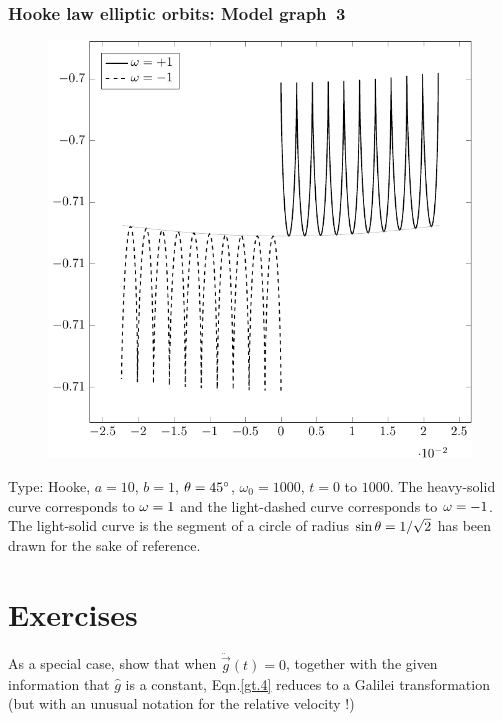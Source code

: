\subsubsection*{Hooke law elliptic orbits: Model graph~3}
\begin{figure}[H]
\centering
\includegraphics[scale=.4]{src/images/lbk-graphics/larm-h-10-1-45-1-1000.pdf}
\caption*{}
\vspace{-.3cm}
\end{figure}

Type: Hooke, $a = 10 $, $b = 1$, ${\theta} = \ang{45}$, 
$\omega_0 = 1000$, $t =0$ to $1000$. The heavy-solid curve 
corresponds to ${\omega} = 1$ and the light-dashed curve 
corresponds to ${\omega} = -1$. The light-solid curve is the 
segment of a  circle of radius $\sin {\theta} = 1 / \sqrt{2}$ 
has been drawn for the sake of reference.

\newpage

\section*{Exercises}

\exise As a special case, show that when 
$\ddot{\vec{g}}(t)=0$, together with the given information 
that $\hat{g}$ is a constant, Eqn.\eqref{gt.4} reduces to a 
Galilei transformation (but with an unusual notation for the 
relative velocity !)

